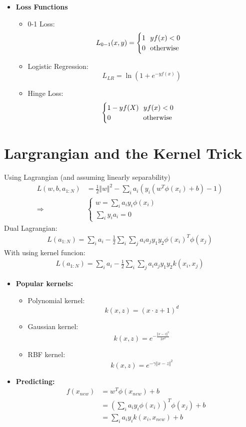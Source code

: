 \documentclass[]{article}
\newcommand{\T}{^T}
\begin{document}
\begin{itemize}
\item \textbf{Loss Functions}
\begin{itemize}
\item 0-1 Loss:\\
\begin{equation*}
L_{0-1} (x, y) = 
\begin{cases}
1 \ \ yf(x) < 0\\
0 \ \ \textup{otherwise}
\end{cases}
\end{equation*}
\item Logistic Regression:
\begin{equation}
L_{LR} = \ln(1 + e^{-yf(x)})
\end{equation}

\item Hinge Loss:
\[ \begin{cases}
	1-yf(X) \ \ yf(x) < 0\\
	0 \ \ \ \ \ \ \ \ \ \ \ \ \ \ \textup{otherwise}
\end{cases} \]
\end{itemize}
\end{itemize}
\section{Largrangian and the Kernel Trick}
Using Lagrangian (and assuming linearly separability) 
\begin{align*}
L(w, b, a_{1:N}) &= \frac{1}{2}\Vert w\Vert ^2 - \sum_i a_i(y_i(w\T\phi(x_i) + b) - 1)\\
\Rightarrow
&\begin{cases}
w = \sum_i a_iy_i\phi(x_i) \\
\sum_iy_ia_i = 0
\end{cases}
\end{align*}
Dual Lagrangian:
\begin{align*}
	L(a_{1:N}) = \sum_ia_i - \frac{1}{2} \sum_i\sum_j a_ia_jy_1y_2 \phi(x_i)\T\phi(x_j)
\end{align*}
With using kernel funcion:
\begin{align*}
L(a_{1:N}) = \sum_ia_i - \frac{1}{2} \sum_i\sum_j a_ia_jy_1y_2 k(x_i, x_j)
\end{align*}
\begin{itemize}
\item \textbf{Popular kernels:}
\begin{itemize}
\item Polynomial kernel: \[ k(x, z) =(x \cdot z + 1)^d\]
\item Gaussian kernel:
\[ k(x, z) =e^{-\frac{\Vert x-z\Vert^2}{2\sigma^2}}\]
\item RBF kernel:
\[ k(x, z) =e^{-\gamma \Vert x-z\Vert^2}\]
\end{itemize}
\item \textbf{Predicting:}
\begin{align*}
f(x_{new}) &= w\T\phi(x_{new}) + b\\
&= \left(\sum_ia_iy_i\phi(x_i)\right)\T\phi(x_j) + b\\
&= \sum_ia_iy_ik(x_i, x_{new}) + b
\end{align*}
\end{itemize}
\end{document}
